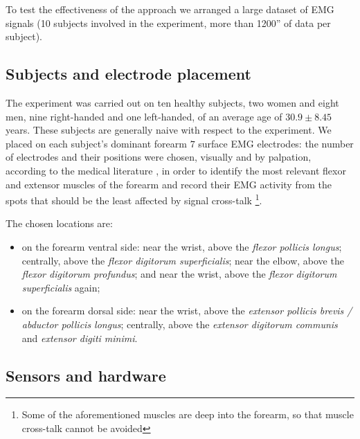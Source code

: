 To test the effectiveness of the approach we arranged a large dataset of EMG signals (10 subjects involved in the experiment, more than 1200'' of data per subject). 

\subsection{Subjects and electrode placement}

The experiment was carried out on ten healthy subjects, two women and eight men, nine right-handed and one left-handed, of an average age of $30.9 \pm 8.45$ years. These subjects are generally naive with respect to the experiment.
We placed on each subject's dominant forearm $7$ surface EMG electrodes: the number of electrodes and their positions were chosen, visually and by palpation, according to the medical literature \cite{Kendall}, in order to identify the most relevant flexor and extensor muscles of the forearm and record their EMG activity from the spots that should be the least affected by signal cross-talk \footnote{Some of the aforementioned muscles are deep into the forearm, so that muscle cross-talk cannot be avoided}.

The chosen locations are:
\begin{itemize}

  \item on the forearm ventral side: near the wrist, above the 
    \emph{flexor pollicis longus}; centrally, above the \emph{flexor
    digitorum superficialis}; near the elbow, above the \emph{flexor
    digitorum profundus}; and near the wrist, above the \emph{flexor
    digitorum superficialis} again;

  \item on the forearm dorsal side: near the wrist, above the
    \emph{extensor pollicis brevis / abductor pollicis longus};
    centrally, above the \emph{extensor digitorum communis} and
    \emph{extensor digiti minimi}.

\end{itemize}

\subsection{Sensors and hardware}

